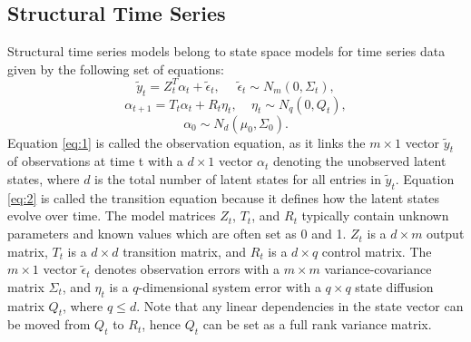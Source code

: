 \documentclass[twoside,11pt]{article}
\begin{document}
\subsection{Structural Time Series}
Structural time series models belong to state space models for time series data given by the following set of equations:
\begin{equation} \label{eq:1}
\tilde{y}_t=Z_t^T\alpha_t+\tilde{\epsilon}_t,  \ \ \ \ \  \ \tilde{\epsilon}_t\sim N_m(0,\Sigma_t),
\end{equation}
\begin{equation} \label{eq:2}
\alpha_{t+1}=T_t\alpha_t+R_t\eta_t,  \ \ \ \ \  \eta_t\sim N_q(0,Q_t),
\end{equation}
\begin{equation} \label{eq:3}
\alpha_0\sim N_d(\mu_0,\Sigma_0).
\end{equation}
Equation \eqref{eq:1} is called the observation equation, as it links the $m\times1$ vector $\tilde{y}_t$ of observations at time t with a $d \times 1$ vector $\alpha_t$ denoting the unobserved latent states, where $d$ is the total number of latent states for all entries in $\tilde{y}_t$.
Equation \eqref{eq:2} is called the transition equation because it defines how the latent states evolve over time. The model matrices $Z_t$, $T_t$, and $R_t$ typically contain unknown parameters and known values which are often set as 0 and 1.
$Z_t$ is a $d\times m$ output matrix, $T_t$ is a $d\times d$ transition matrix, and $R_t$ is a $d\times q$ control matrix.
The $m\times 1$ vector $\tilde{\epsilon}_t$ denotes observation errors with a $m\times m$ variance-covariance matrix $\Sigma_t$, and $\eta_t$  is a $q$-dimensional system error with a $q\times q$ state diffusion matrix $Q_t$, where $q\leq d$.
Note that any linear dependencies in the state vector can be moved from $Q_t$ to $R_t$, hence $Q_t$ can be set as a full rank variance matrix. 
\end{document}
